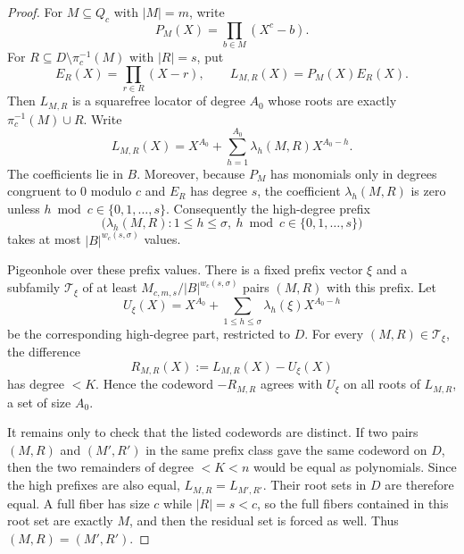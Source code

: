 \documentclass[11pt]{article}
\theoremstyle{definition}
\theoremstyle{remark}
\newcommand{\B}{B}
\begin{document}
\begin{proof}
For $M\subseteq Q_c$ with $|M|=m$, write
\[
        P_M(X)=\prod_{b\in M}(X^c-b).
\]
For $R\subseteq D\setminus \pi_c^{-1}(M)$ with $|R|=s$, put
\[
        E_R(X)=\prod_{r\in R}(X-r),
        \qquad
        L_{M,R}(X)=P_M(X)E_R(X).
\]
Then $L_{M,R}$ is a squarefree locator of degree $A_0$ whose roots are exactly
\(\pi_c^{-1}(M)\cup R\).  Write
\[
        L_{M,R}(X)=X^{A_0}+\sum_{h=1}^{A_0}\lambda_h(M,R)X^{A_0-h}.
\]
The coefficients lie in $\B$.  Moreover, because $P_M$ has monomials only in
degrees congruent to $0$ modulo $c$ and $E_R$ has degree $s$, the coefficient
$\lambda_h(M,R)$ is zero unless $h\bmod c\in\{0,1,\ldots,s\}$.
Consequently the high-degree prefix
\[
        \bigl(\lambda_h(M,R):1\le h\le\sigma,
              \ h\bmod c\in\{0,1,\ldots,s\}\bigr)
\]
takes at most $|\B|^{w_c(s,\sigma)}$ values.

Pigeonhole over these prefix values.  There is a fixed prefix vector $\xi$ and a
subfamily $\mathcal T_\xi$ of at least
$M_{c,m,s}/|\B|^{w_c(s,\sigma)}$ pairs $(M,R)$ with this prefix.  Let
\[
        U_\xi(X)=X^{A_0}+\sum_{1\le h\le\sigma}\lambda_h(\xi)X^{A_0-h}
\]
be the corresponding high-degree part, restricted to $D$.  For every
$(M,R)\in\mathcal T_\xi$, the difference
\[
        R_{M,R}(X):=L_{M,R}(X)-U_\xi(X)
\]
has degree $<K$.  Hence the codeword $-R_{M,R}$ agrees with $U_\xi$ on all
roots of $L_{M,R}$, a set of size $A_0$.

It remains only to check that the listed codewords are distinct.  If two pairs
$(M,R)$ and $(M',R')$ in the same prefix class gave the same codeword on $D$,
then the two remainders of degree $<K<n$ would be equal as polynomials.  Since
the high prefixes are also equal, $L_{M,R}=L_{M',R'}$.  Their root sets in $D$
are therefore equal.  A full fiber has size $c$ while $|R|=s<c$, so the full
fibers contained in this root set are exactly $M$, and then the residual set is
forced as well.  Thus $(M,R)=(M',R')$.
\end{proof}
\end{document}
